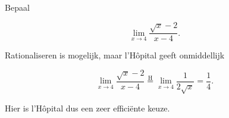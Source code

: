\documentclass{ximera}
\begin{document}
\begin{voorbeeld}
Bepaal

\[\lim_{x\to4}\frac{\sqrt{x}-2}{x-4}.\]

Rationaliseren is mogelijk, maar l'Hôpital geeft onmiddellijk

\[
\lim_{x\to4}\frac{\sqrt{x}-2}{x-4}
\overset{\mathrm H}{=}
\lim_{x\to4}\frac1{2\sqrt{x}}
=\frac14.
\]

Hier is l'Hôpital dus een zeer efficiënte keuze.
\end{voorbeeld}


\end{document}
